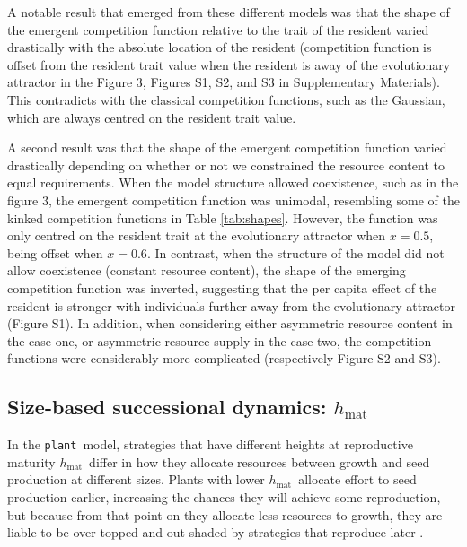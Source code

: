 \documentclass[a4paper,11pt]{article}
\newcommand{\plant}{{\tt plant}}
\newcommand{\hmat}{\ensuremath{h_{\text{mat}}}}
\begin{document}
A notable result that emerged from these different models was that the shape of the emergent competition function relative to the trait of the resident varied drastically with the absolute location of the resident (competition function is offset from the resident trait value when the resident is away of the evolutionary attractor in the Figure 3, Figures S1, S2, and S3 in Supplementary Materials). This contradicts with the classical competition functions, such as the Gaussian, which are always centred on the resident trait value. 

A second result was that the shape of the emergent competition function varied drastically depending on whether or not we constrained the resource content to equal requirements. When the model structure allowed coexistence, such as in the figure 3, the emergent competition function was unimodal, resembling some of the kinked competition functions in Table \ref{tab:shapes}. However, the function was only centred on the resident trait at the evolutionary attractor when $x = 0.5$, being offset when $x = 0.6$. In contrast, when the structure of the model did not allow coexistence (constant resource content), the shape of the emerging competition function was inverted, suggesting that the per capita effect of the resident is stronger with individuals further away from the evolutionary attractor (Figure S1). In addition, when considering either asymmetric resource content in the case one, or asymmetric resource supply in the case two, the competition functions were considerably more complicated (respectively Figure S2 and S3). 

\subsection{Size-based successional dynamics: \hmat}

In the \plant\ model, strategies that have different heights at reproductive maturity \hmat\ differ in how they allocate resources between growth and seed production at different sizes. Plants with lower \hmat\ allocate effort to seed production earlier, increasing the chances they will achieve some reproduction, but because from that point on they allocate less resources to growth, they are liable to be over-topped and out-shaded by strategies that reproduce later \citep{Falster-2017}.
\end{document}
